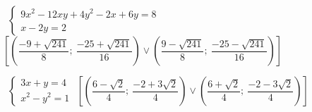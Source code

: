 \begin{esercizio}[\Ast]
\begin{enumeratea}
\item~$\left\{\begin{array}{l}9x^2-12xy+4y^2-2x+6y=8\\x-2y=2\end{array}
\right.$
\hfill$\left[\left(\dfrac{-9+\sqrt{241}} 
8;~\dfrac{-25+\sqrt{241}}{16}\right)\vee 
\left(\dfrac{9-\sqrt{241}} 8;~\dfrac{-25-\sqrt{241}}{16}\right)\right]$
 \item~$\left\{\begin{array}{l}3x+y=4\\x^2-y^2=1\end{array}\right.$
\hfill$\left[\left(\dfrac{6-\sqrt 2} 4;~\dfrac{-2+3\sqrt 2} 4\right)\vee 
\left(\dfrac{6+\sqrt 2} 4;~\dfrac{-2-3\sqrt 2} 4\right)\right]$
 \end{enumeratea}
\end{esercizio}

